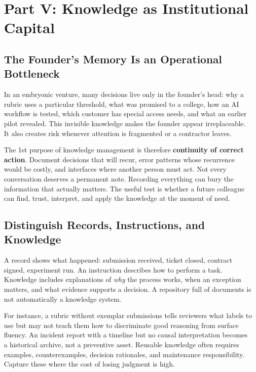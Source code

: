 \section*{Part V: Knowledge as Institutional Capital}

\subsection{The Founder's Memory Is an Operational Bottleneck}
\label{sec:founder_memory_bottleneck}

In an embryonic venture, many decisions live only in the founder's head: why a rubric uses a particular threshold, what was promised to a college, how an AI workflow is tested, which customer has special access needs, and what an earlier pilot revealed. This invisible knowledge makes the founder appear irreplaceable. It also creates risk whenever attention is fragmented or a contractor leaves.

The 1st purpose of knowledge management is therefore \textbf{continuity of correct action}. Document decisions that will recur, error patterns whose recurrence would be costly, and interfaces where another person must act. Not every conversation deserves a permanent note. Recording everything can bury the information that actually matters. The useful test is whether a future colleague can find, trust, interpret, and apply the knowledge at the moment of need.

\subsection{Distinguish Records, Instructions, and Knowledge}
\label{sec:records_instructions_knowledge}

A record shows what happened: submission received, ticket closed, contract signed, experiment run. An instruction describes how to perform a task. Knowledge includes explanations of \textit{why} the process works, when an exception matters, and what evidence supports a decision. A repository full of documents is not automatically a knowledge system.

For instance, a rubric without exemplar submissions tells reviewers what labels to use but may not teach them how to discriminate good reasoning from surface fluency. An incident report with a timeline but no causal interpretation becomes a historical archive, not a preventive asset. Reusable knowledge often requires examples, counterexamples, decision rationales, and maintenance responsibility. Capture these where the cost of losing judgment is high.

